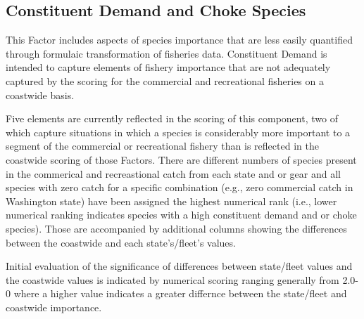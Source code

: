 \documentclass[11pt,
  english,
  a4paper,
]{article}
\begin{document}
\leavevmode\tagmcend\tagstructend\par
\endgroup{}
\endgroup{}


\hypertarget{constituent-demand-and-choke-species}{%
\subsection{Constituent Demand and Choke Species}\label{constituent-demand-and-choke-species}}

\leavevmode\tagmcend\tagstructend


This Factor includes aspects of species importance that are less easily quantified through formulaic transformation of fisheries data. Constituent Demand is intended to capture elements of fishery importance that are not adequately captured by the scoring for the commercial and recreational fisheries on a coastwide basis.

\leavevmode\tagmcend\tagstructend\par


Five elements are currently reflected in the scoring of this component, two of which capture situations in which a species is considerably more important to a segment of the commercial or recreational fishery than is reflected in the coastwide scoring of those Factors. There are different numbers of species present in the commerical and recreastional catch from each state and or gear and all species with zero catch for a specific combination (e.g., zero commercial catch in Washington state) have been assigned the highest numerical rank (i.e., lower numerical ranking indicates species with a high constituent demand and or choke species). Those are accompanied by additional columns showing the differences between the coastwide and each state's/fleet's values.

\leavevmode\tagmcend\tagstructend\par


Initial evaluation of the significance of differences between state/fleet values and the coastwide values is indicated by numerical scoring ranging generally from 2.0-0 where a higher value indicates a greater differnce between the state/fleet and coastwide importance.
\end{document}

